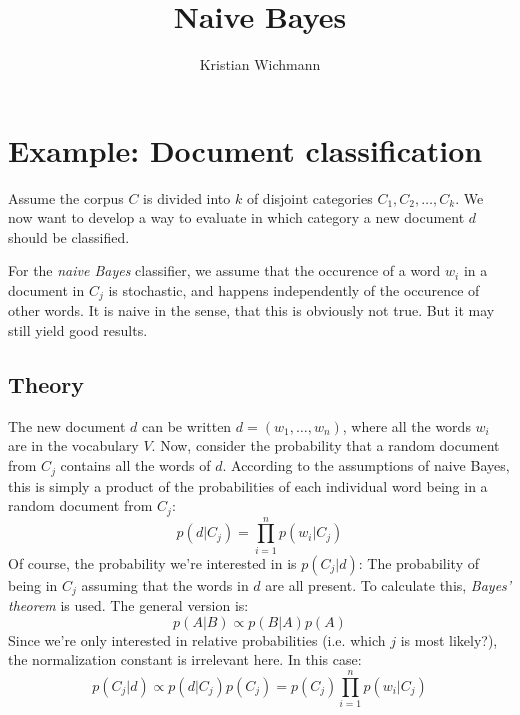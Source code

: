 \documentclass[12pt, a4paper]{article}
\title{Naive Bayes}
\author{Kristian Wichmann}
\numberwithin{equation}{section}
\begin{document}
\maketitle

\section{Example: Document classification}
Assume the corpus $C$ is divided into $k$ of disjoint categories $C_1, C_2,\ldots, C_k$. We now want to develop a way to evaluate in which category a new document $d$ should be classified.

For the \textit{naive Bayes} classifier, we assume that the occurence of a word $w_i$ in a document in $C_j$ is stochastic, and happens independently of the occurence of other words. It is naive in the sense, that this is obviously not true. But it may still yield good results.

\subsection{Theory}
The new document $d$ can be written $d=(w_1,\ldots,w_n)$, where all the words $w_i$ are in the vocabulary $V$. Now, consider the probability that a random document from $C_j$ contains all the words of $d$. According to the assumptions of naive Bayes, this is simply a product of the probabilities of each individual word being in a random document from $C_j$:
\begin{equation}
p(d|C_j)=\prod_{i=1}^n p(w_i|C_j)
\end{equation}
Of course, the probability we're interested in is $p(C_j|d)$: The probability of being in $C_j$ assuming that the words in $d$ are all present. To calculate this, \textit{Bayes' theorem} is used. The general version is:
\begin{equation}
p(A|B)\propto p(B|A)p(A)
\end{equation}
Since we're only interested in relative probabilities (i.e. which $j$ is most likely?), the normalization constant is irrelevant here. In this case:
\begin{equation}
p(C_j|d)\propto p(d|C_j)p(C_j)=p(C_j)\prod_{i=1}^n p(w_i|C_j)
\end{equation}
\end{document}
